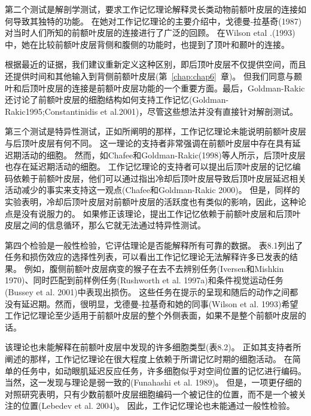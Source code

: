 第二个测试是解剖学测试，要求工作记忆理论解释灵长类动物前额叶皮层的连接如何导致其独特的功能。
在她对工作记忆理论的主要介绍中，戈德曼-拉基奇(1987)对当时人们所知的前额叶皮层的连接进行了广泛的回顾。
在Wilson etal .(1993)中，她在比较前额叶皮层背侧和腹侧的功能时，也提到了顶叶和颞叶的连接。
\par


根据最近的证据，我们建议重新定义这种区别，即后顶叶皮层不仅提供空间，而且还提供时间和其他输入到背侧前额叶皮层(第~\ref{chap:chap6}~章)。
但我们同意与颞叶和后顶叶皮层的连接是前额叶皮层功能的一个重要方面。最后，Goldman-Rakic还讨论了前额叶皮层的细胞结构如何支持工作记忆(Goldman-Rakic1995;Constantinidis et al.2001)，尽管这些想法并没有直接针对解剖测试。
\par


第三个测试是特异性测试，正如所阐明的那样，工作记忆理论未能说明前额叶皮层与后顶叶皮层有何不同。
这一理论的支持者非常强调在前额叶皮层中存在具有延迟期活动的细胞。
然而，如Chafee和Goldman-Rakic(1998)等人所示，后顶叶皮层也存在延迟期活动的细胞。
工作记忆理论的支持者可以提出后顶叶皮层的记忆编码依赖于前额叶皮层，他们可以通过指出冷却后顶叶皮层导致后顶叶皮层延迟相关活动减少的事实来支持这一观点(Chafee和Goldman-Rakic 2000)。
但是，同样的实验表明，冷却后顶叶皮层对前额叶皮层的活跃度也有类似的影响，因此，这种论点是没有说服力的。
如果修正该理论，提出工作记忆依赖于前额叶皮层和后顶叶皮层之间的信息循环，那么它就无法通过特异性测试。
\par


第四个检验是一般性检验，它评估理论是否能解释所有可靠的数据。
表8.1列出了任务和损伤效应的选择性列表，可以看出工作记忆理论无法解释许多已发表的结果。
例如，腹侧前额叶皮层病变的猴子在去不去辨别任务(Iversen和Mishkin 1970)、同时匹配到前样例任务(Rushworth et al. 1997a)和条件视觉运动任务(Bussey et al. 2001)中表现出损伤。
这些任务在提示的呈现和随后的动作之间都没有延迟期。然而，很明显，戈德曼-拉基奇和她的同事(Wilson et al. 1993)希望工作记忆理论至少适用于前额叶皮层的整个外侧表面，如果不是整个前额叶皮层的话。
\par


该理论也未能解释在前额叶皮层中发现的许多细胞类型(表8.2)。
正如其支持者所阐述的那样，工作记忆理论在很大程度上依赖于所谓记忆时期的细胞活动。
在简单的任务中，如动眼肌延迟反应任务，许多细胞似乎对空间位置的记忆进行编码。
当然，这一发现与理论是弱一致的(Funahashi et al. 1989)。
但是，一项更仔细的对照研究表明，只有少数前额叶皮层细胞编码一个被记住的位置，而不是一个被关注的位置(Lebedev et al. 2004)。
因此，工作记忆理论也未能通过一般性检验。
\par


